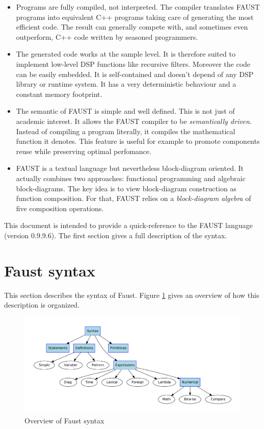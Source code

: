 \documentclass{article}
\begin{document}
\begin{itemize}


\item Programs are fully compiled, not interpreted. The compiler translates FAUST programs into equivalent C++ programs taking care of generating the most efficient code. The result can generally compete with, and sometimes even outperform, C++ code written by seasoned programmers. 

\item The generated code works at the sample level. It is therefore suited to implement low-level DSP functions like recursive filters. Moreover the code can be easily embedded. It is self-contained and doesn't depend of any DSP library or runtime system. It has a very deterministic behaviour and a constant memory footprint. 

\item The semantic of FAUST is simple and well defined. This is not just of academic interest. It allows the FAUST compiler to be \emph{semantically driven}. Instead of compiling a program literally, it compiles the mathematical function it denotes. This feature is useful for example to promote components reuse while preserving optimal perfomance.  

\item FAUST is a textual language but nevertheless block-diagram oriented. It actually combines two approaches: functional programming and algebraic block-diagrams. The key idea is to view block-diagram construction as function composition. For that, FAUST relies on a \emph{block-diagram algebra} of five composition operations.

\end{itemize}

This document is intended to provide a quick-reference to the FAUST language (version 0.9.9.6). The first section gives a full description of the syntax.



\section{Faust syntax}

This section describes the syntax of Faust. Figure \ref{fig:syntax} gives an overview of how this description is organized. 

\begin{figure}[ht!]
\centering
\includegraphics[scale=0.5]{illustrations/syntax-chart}
\caption{Overview of Faust syntax}
\label{fig:syntax}
\end{figure}
\end{document}
